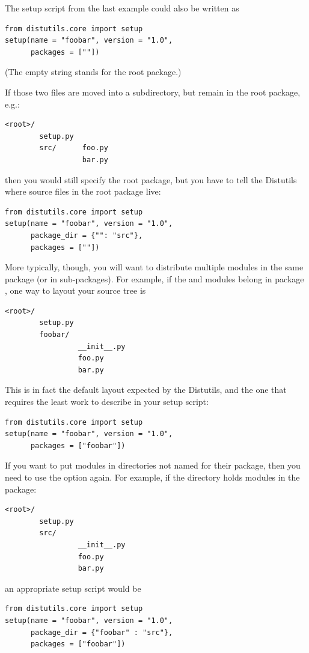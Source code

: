 \documentclass{howto}
\begin{document}
The setup script from the last example could also be written as
\begin{verbatim}
from distutils.core import setup
setup(name = "foobar", version = "1.0",
      packages = [""])
\end{verbatim}
(The empty string stands for the root package.)

If those two files are moved into a subdirectory, but remain in the root
package, e.g.:
\begin{verbatim}
<root>/
        setup.py
        src/      foo.py
                  bar.py
\end{verbatim}
then you would still specify the root package, but you have to tell the
Distutils where source files in the root package live:
\begin{verbatim}
from distutils.core import setup
setup(name = "foobar", version = "1.0",
      package_dir = {"": "src"},
      packages = [""])
\end{verbatim}

More typically, though, you will want to distribute multiple modules in
the same package (or in sub-packages).  For example, if the  
and  modules belong in package , one way to
layout your source tree is
\begin{verbatim}
<root>/
        setup.py
        foobar/
                 __init__.py
                 foo.py
                 bar.py
\end{verbatim}
This is in fact the default layout expected by the Distutils, and the
one that requires the least work to describe in your setup script:
\begin{verbatim}
from distutils.core import setup
setup(name = "foobar", version = "1.0",
      packages = ["foobar"])
\end{verbatim}

If you want to put modules in directories not named for their package,
then you need to use the  option again.  For
example, if the  directory holds modules in the
 package:
\begin{verbatim}
<root>/
        setup.py
        src/
                 __init__.py
                 foo.py
                 bar.py
\end{verbatim}
an appropriate setup script would be
\begin{verbatim}
from distutils.core import setup
setup(name = "foobar", version = "1.0",
      package_dir = {"foobar" : "src"},
      packages = ["foobar"])
\end{verbatim}
\end{document}
